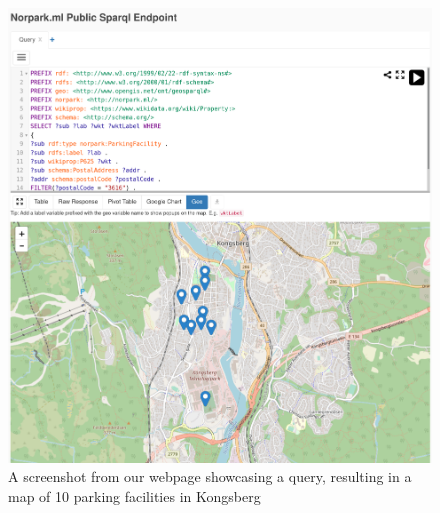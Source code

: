 \begin{figure}[H]
	\centering
	\includegraphics[width=\linewidth]{figures/query-screenshot.png}
	\caption{A screenshot from our webpage showcasing a query, resulting in a map of 10 parking facilities in Kongsberg}
\end{figure}
